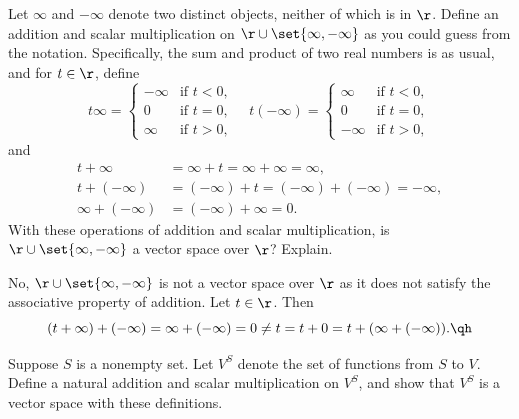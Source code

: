 \begin{exercise}[1b6]
    Let $\infty$ and $-\infty$ denote two distinct objects, neither of which is in $\r$. Define an addition and scalar multiplication on $\r \cup \set{\infty, -\infty}$ as you could guess from the notation. Specifically, the sum and product of two real numbers is as usual, and for $t \in \r$, define
    \[t\infty = 
    \begin{cases}
        -\infty & \text{if } t < 0, \\
        0 & \text{if } t = 0, \\
        \infty & \text{if } t > 0,
    \end{cases} \quad
    t(-\infty) = 
    \begin{cases}
        \infty & \text{if } t < 0, \\
        0 & \text{if } t = 0, \\
        -\infty & \text{if } t > 0,
    \end{cases}\]
    and
    \begin{align*}
        t + \infty & = \infty + t = \infty + \infty = \infty, \\
        t + (-\infty) & = (-\infty) + t = (-\infty) + (-\infty) = -\infty, \\
        \infty + (-\infty) & = (-\infty) + \infty = 0.
    \end{align*}
    With these operations of addition and scalar multiplication, is $\r \cup \set{\infty, -\infty}$ a vector space over $\r$? Explain.
\end{exercise}

\begin{sol}
    No, $\r \cup \set{\infty, -\infty}$ is not a vector space over $\r$ as it does not satisfy the associative property of addition. Let $t \in \r$. Then
    \[(t + \infty) + (-\infty) = \infty + (-\infty) = 0 \neq t = t + 0 = t + (\infty + (-\infty)). \qh\]
\end{sol}

\begin{exercise}[1b7]
    Suppose $S$ is a nonempty set. Let $V^S$ denote the set of functions from $S$ to $V$. Define a natural addition and scalar multiplication on $V^S$, and show that $V^S$ is a vector space with these definitions.
\end{exercise}

